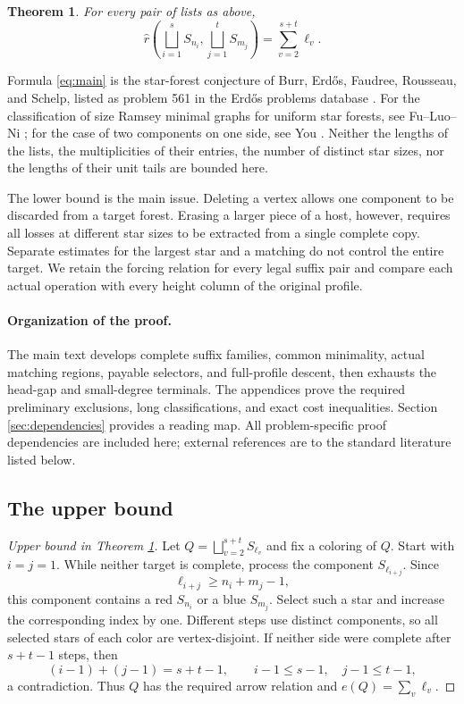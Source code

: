\documentclass[11pt,a4paper]{article}
\newcommand{\rh}{\widehat r}
\newcommand{\sq}{\bigsqcup}
\newtheorem{theorem}{Theorem}[section]
\theoremstyle{definition}
\begin{document}
\begin{theorem}\label{thm:main}
For every pair of lists as above,
\begin{equation}\label{eq:main}
\rh\left(\sq_{i=1}^{s}S_{n_i},\sq_{j=1}^{t}S_{m_j}\right)
=\sum_{v=2}^{s+t}\ell_v.
\end{equation}
\end{theorem}

Formula \eqref{eq:main} is the star-forest conjecture of Burr, Erdős, Faudree, Rousseau, and Schelp, listed as problem 561 in the Erdős problems database \cite{erdos}. For the classification of size Ramsey minimal graphs for uniform star forests, see Fu--Luo--Ni \cite{fln}; for the case of two components on one side, see You \cite{you}. Neither the lengths of the lists, the multiplicities of their entries, the number of distinct star sizes, nor the lengths of their unit tails are bounded here.

The lower bound is the main issue. Deleting a vertex allows one component to be discarded from a target forest. Erasing a larger piece of a host, however, requires all losses at different star sizes to be extracted from a single complete copy. Separate estimates for the largest star and a matching do not control the entire target. We retain the forcing relation for every legal suffix pair and compare each actual operation with every height column of the original profile.

\paragraph{Organization of the proof.}
The main text develops complete suffix families, common minimality, actual matching regions, payable selectors, and full-profile descent, then exhausts the head-gap and small-degree terminals. The appendices prove the required preliminary exclusions, long classifications, and exact cost inequalities. Section \ref{sec:dependencies} provides a reading map. All problem-specific proof dependencies are included here; external references are to the standard literature listed below.

\subsection{The upper bound}
\begin{proof}[Upper bound in Theorem \ref{thm:main}]
Let $Q=\sq_{v=2}^{s+t}S_{\ell_v}$ and fix a coloring of $Q$. Start with $i=j=1$. While neither target is complete, process the component $S_{\ell_{i+j}}$. Since
\[
\ell_{i+j}\ge n_i+m_j-1,
\]
this component contains a red $S_{n_i}$ or a blue $S_{m_j}$. Select such a star and increase the corresponding index by one. Different steps use distinct components, so all selected stars of each color are vertex-disjoint. If neither side were complete after $s+t-1$ steps, then
\[
(i-1)+(j-1)=s+t-1,\qquad i-1\le s-1,\quad j-1\le t-1,
\]
a contradiction. Thus $Q$ has the required arrow relation and $e(Q)=\sum_v\ell_v$.
\end{proof}
\end{document}
